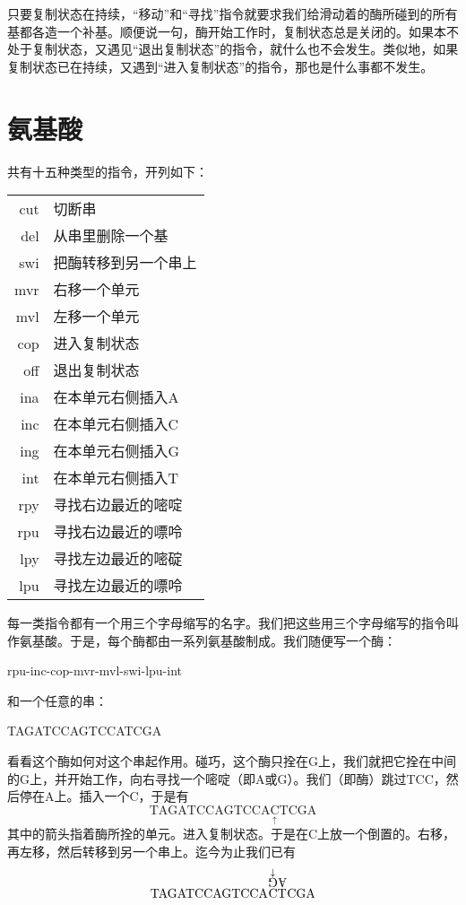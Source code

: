 只要复制状态在持续，“移动”和“寻找”指令就要求我们给滑动着的酶所碰到的所有基都各造一个补基。顺便说一句，酶开始工作时，复制状态总是关闭的。如果本不处于复制状态，又遇见“退出复制状态”的指令，就什么也不会发生。类似地，如果复制状态已在持续，又遇到“进入复制状态”的指令，那也是什么事都不发生。

\section{氨基酸}

共有十五种类型的指令，开列如下：
\begin{longtable}[c]{r!{——}l}
cut & 切断串\\
del & 从串里删除一个基\\
swi & 把酶转移到另一个串上\\
mvr & 右移一个单元\\
mvl & 左移一个单元\\
cop & 进入复制状态\\
off & 退出复制状态\\
ina & 在本单元右侧插入A\\
inc & 在本单元右侧插入C\\
ing & 在本单元右侧插入G\\
int & 在本单元右侧插入T\\
rpy & 寻找右边最近的嘧啶\\
rpu & 寻找右边最近的嘌呤\\
lpy & 寻找左边最近的嘧碇\\
lpu & 寻找左边最近的嘌呤
\end{longtable}
每一类指令都有一个用三个字母缩写的名字。我们把这些用三个字母缩写的指令叫作氨基酸。于是，每个酶都由一系列氨基酸制成。我们随便写一个酶：
\begin{center}
rpu-inc-cop-mvr-mvl-swi-lpu-int
\end{center}
和一个任意的串：
\begin{center}
TAGATCCAGTCCATCGA
\end{center}
看看这个酶如何对这个串起作用。碰巧，这个酶只拴在G上，我们就把它拴在中间的G上，并开始工作，向右寻找一个嘧啶（即A或G）。我们（即酶）跳过TCC，然后停在A上。插入一个C，于是有
\[
\mathrm{TAGATCCAGTCCA}\underset{\uparrow}{\mathrm{C}}\mathrm{TCGA}
\]
其中的箭头指着酶所拴的单元。进入复制状态。于是在C上放一个倒置的。右移，再左移，然后转移到另一个串上。迄今为止我们已有
\[
\mathrm{TAGATCCAGTCCA}
\begin{array}[b]{@{}c@{}}
\overset{\downarrow}{\rotatebox[origin=c]{180}{G}}
\rotatebox[origin=c]{180}{A}\\[-\dp\strutbox]
\mathrm{CT}
\end{array}
\mathrm{CGA}
\]

